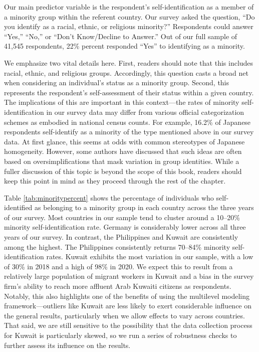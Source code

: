 Our main predictor variable is the respondent's self-identification as a member of a minority group within the referent country. Our survey asked the question, ``Do you identify as a racial, ethnic, or religious minority?'' Respondents could answer ``Yes,'' ``No,'' or ``Don't Know/Decline to Answer.'' Out of our full sample of 41,545 respondents, 22\% percent responded ``Yes'' to identifying as a minority.  

We emphasize two vital details here. First, readers should note that this includes racial, ethnic, and religious groups. Accordingly, this question casts a broad net when considering an individual's status as a minority group. Second, this represents the respondent's self-assessment of their status within a given country. The implications of this are important in this context---the rates of minority self-identification in our survey data may differ from various official categorization schemes as embodied in national census counts. For example, 16.2\% of Japanese respondents self-identify as a minority of the type mentioned above in our survey data. At first glance, this seems at odds with common stereotypes of Japanese homogeneity. However, some authors have discussed that such ideas are often based on oversimplifications that mask variation in group identities.\cite{Johnson2019} While a fuller discussion of this topic is beyond the scope of this book, readers should keep this point in mind as they proceed through the rest of the chapter. 

Table \ref{tab:minoritypercent} shows the percentage of individuals who self-identified as belonging to a minority group in each country across the three years of our survey. Most countries in our sample tend to cluster around a 10--20\% minority self-identification rate. Germany is considerably lower across all three years of our survey. In contrast, the Philippines and Kuwait are consistently among the highest. The Philippines consistently returns 70--84\% minority self-identification rates. Kuwait exhibits the most variation in our sample, with a low of 30\% in 2018 and a high of 98\% in 2020. We expect this to result from a relatively large population of migrant workers in Kuwait and a bias in the survey firm's ability to reach more affluent Arab Kuwaiti citizens as respondents. Notably, this also highlights one of the benefits of using the multilevel modeling framework---outliers like Kuwait are less likely to exert considerable influence on the general results, particularly when we allow effects to vary across countries. That said, we are still sensitive to the possibility that the data collection process for Kuwait is particularly skewed, so we run a series of robustness checks to further assess its influence on the results.


